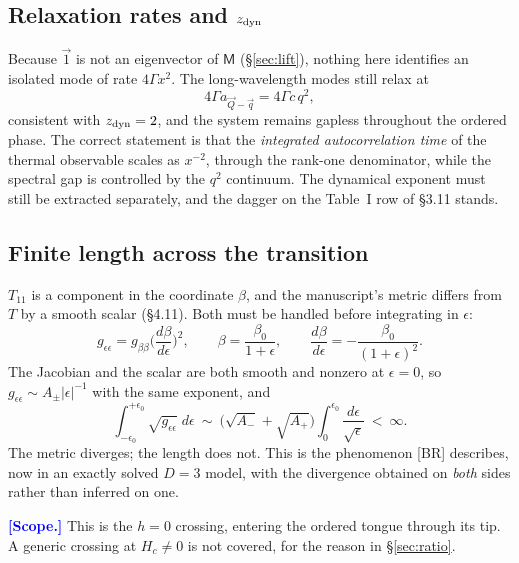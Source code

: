 \documentclass[11pt,a4paper]{article}
\newcommand{\bQ}{\vec Q}
\newcommand{\bq}{\vec q}
\newcommand{\FLAG}[1]{\textcolor{blue}{\textbf{[#1]}}}
\newcommand{\Mc}{\mathsf{M}}
\newcommand{\Tm}{T}
\newcommand{\bQ}{\vec Q}
\newcommand{\bq}{\vec q}
\newcommand{\FLAG}[1]{\textcolor{blue}{\textbf{[#1]}}}
\begin{document}
\subsection{Relaxation rates and $z_{\rm dyn}$}
\label{sec:rates}
Because $\vec1$ is not an eigenvector of $\Mc$ (\S\ref{sec:lift}), nothing here identifies an
isolated mode of rate $4\Gamma x^2$. The long-wavelength modes still relax at
\begin{equation}
  4\Gamma a_{\bQ-\bq}=4\Gamma c\,q^{2},
\end{equation}
consistent with $z_{\rm dyn}=2$, and the system remains gapless throughout the ordered
phase. The correct statement is that the \emph{integrated autocorrelation time} of the
thermal observable scales as $x^{-2}$, through the rank-one denominator, while the spectral
gap is controlled by the $q^2$ continuum. The dynamical exponent must still be extracted
separately, and the dagger on the Table~I row of \S3.11 stands.

\subsection{Finite length across the transition}
\label{sec:length}
$\Tm_{11}$ is a component in the coordinate $\beta$, and the manuscript's metric differs
from $\Tm$ by a smooth scalar (\S4.11). Both must be handled before integrating in
$\epsilon$:
\begin{equation}
  g_{\epsilon\epsilon}=g_{\beta\beta}\Big(\frac{d\beta}{d\epsilon}\Big)^{2},
  \qquad
  \beta=\frac{\beta_0}{1+\epsilon},
  \qquad
  \frac{d\beta}{d\epsilon}=-\frac{\beta_0}{(1+\epsilon)^{2}} .
\end{equation}
The Jacobian and the scalar are both smooth and nonzero at $\epsilon=0$, so
$g_{\epsilon\epsilon}\sim A_\pm|\epsilon|^{-1}$ with the same exponent, and
\begin{equation}
  \int_{-\epsilon_0}^{+\epsilon_0}\sqrt{g_{\epsilon\epsilon}}\;d\epsilon
  \ \sim\ \big(\sqrt{A_-}+\sqrt{A_+}\big)\int_0^{\epsilon_0}\frac{d\epsilon}{\sqrt\epsilon}
  \ <\ \infty .
\end{equation}
The metric diverges; the length does not. This is the phenomenon [BR] describes, now in an
exactly solved $D=3$ model, with the divergence obtained on \emph{both} sides rather than
inferred on one.

\FLAG{Scope.} This is the $h=0$ crossing, entering the ordered tongue through its tip. A
generic crossing at $H_c\neq0$ is not covered, for the reason in \S\ref{sec:ratio}.
\end{document}
